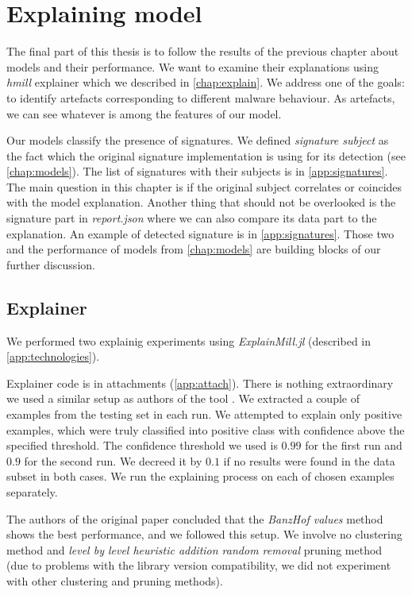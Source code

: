 \chapter{Explaining model} \label{chap:expex}
The final part of this thesis is to follow the results of the previous chapter about models and their performance. We want to examine their explanations using \emph{hmill} explainer \cite{Pevny2020} which we described in \ref{chap:explain}. We address one of the goals: to identify artefacts corresponding to different malware behaviour. As artefacts, we can see whatever is among the features of our model. 

Our models classify the presence of signatures. We defined \emph{signature subject} as the fact which the original signature implementation is using for its detection (see \ref{chap:models}). The list of signatures with their subjects is in \ref{app:signatures}. The main question in this chapter is if the original subject correlates or coincides with the model explanation. Another thing that should not be overlooked is the signature part in \emph{report.json} where we can also compare its data part to the explanation. An example of detected signature is in \ref{app:signatures}. Those two and the performance of models from \ref{chap:models} are building blocks of our further discussion.

\section{Explainer}
We performed two explainig experiments using \emph{ExplainMill.jl} (described in \ref{app:technologies}). 

Explainer code is in attachments (\ref{app:attach}). There is nothing extraordinary we used a similar setup as authors of the tool \cite{Pevny2020}. We extracted a couple of examples from the testing set in each run. We attempted to explain only positive examples, which were truly classified into positive class with confidence above the specified threshold. The confidence threshold we used is $0.99$ for the first run and $0.9$ for the second run. We decreed it by $0.1$ if no results were found in the data subset in both cases. We run the explaining process on each of chosen examples separately.

The authors of the original paper concluded that the \emph{BanzHof values} method shows the best performance, and we followed this setup. We involve no clustering method and \emph{level by level heuristic addition random removal} pruning method (due to problems with the library version compatibility, we did not experiment with other clustering and pruning methods). 

